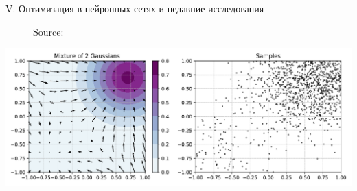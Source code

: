 \documentclass[9pt, aspectratio=169]{beamer}
\begin{document}
\begin{frame}{V. Оптимизация в нейронных сетях и недавние исследования}
\begin{minipage}{0.382\textwidth}
\begin{figure}
            \caption{Source: \cite{belkin2019reconciling}}
        \end{figure}
        \centering
        \includegraphics[width=\linewidth]{diff.pdf}
    \end{minipage}
\end{frame}
\end{document}
